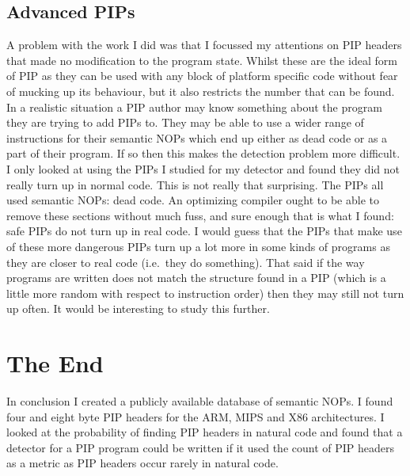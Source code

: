 \documentclass[10pt]{book}
\begin{document}
\subsection{Advanced PIPs}

A problem with the work I did was that I focussed my attentions on PIP
headers that made no modification to the program state. Whilst these are
the ideal form of PIP as they can be used with any block of platform
specific code without fear of mucking up its behaviour, but it also
restricts the number that can be found. In a realistic situation a PIP
author may know something about the program they are trying to add PIPs
to. They may be able to use a wider range of instructions for their
semantic NOPs which end up either as dead code or as a part of their
program. If so then this makes the detection problem more difficult. I
only looked at using the PIPs I studied for my detector and found they
did not really turn up in normal code. This is not really that
surprising. The PIPs all used semantic NOPs: dead code. An optimizing
compiler ought to be able to remove these sections without much fuss,
and sure enough that is what I found: safe PIPs do not turn up in real
code. I would guess that the PIPs that make use of these more dangerous
PIPs turn up a lot more in some kinds of programs as they are closer to
real code (i.e.~they do something). That said if the way programs are
written does not match the structure found in a PIP (which is a little
more random with respect to instruction order) then they may still not
turn up often. It would be interesting to study this further.

\section{The End}

In conclusion I created a publicly available database of semantic NOPs.
I found four and eight byte PIP headers for the ARM, MIPS and X86
architectures. I looked at the probability of finding PIP headers in
natural code and found that a detector for a PIP program could be
written if it used the count of PIP headers as a metric as PIP headers
occur rarely in natural code.
\end{document}
